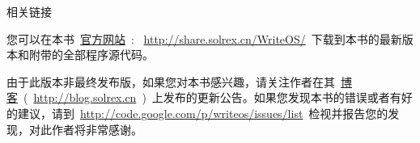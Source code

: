\vspace{5ex}

\begin{lined}{\textwidth}\vspace{2ex}
\begin{center}
相关链接
\end{center}
\vspace{2ex}
\end{lined}

您可以在本书~\href{http://share.solrex.cn/WriteOS/}{官方网站}~: ~\url{http://share.solrex.cn/WriteOS/}~下载到本书的最新版本和附带的全部程序源代码。

由于此版本非最终发布版，如果您对本书感兴趣，请关注作者在其~\href{http://blog.solrex.cn/articles/category/cs/opensource/writeos}{博客}~(~\url{http://blog.solrex.cn}~)~上发布的更新公告。如果您发现本书的错误或者有好的建议，请到~\url{http://code.google.com/p/writeos/issues/list}~检视并报告您的发现，对此作者将非常感谢。
